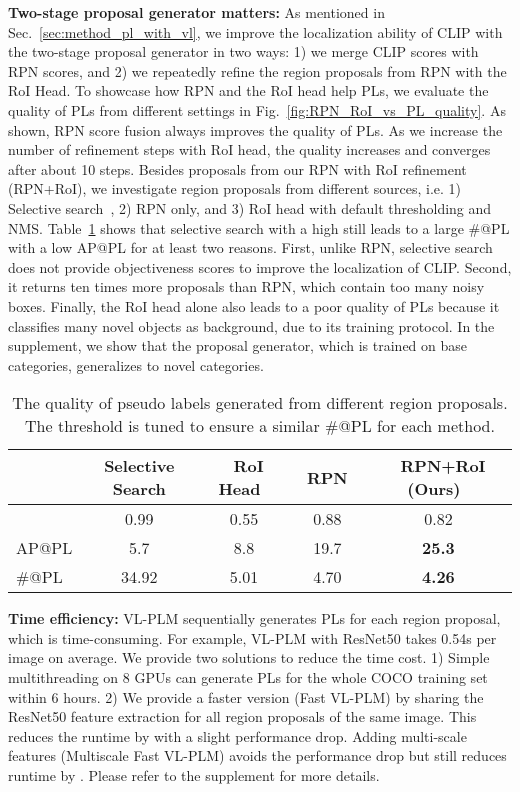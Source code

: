 \documentclass[runningheads]{llncs}
\begin{document}
\vspace{1mm}
\noindent \textbf{Two-stage proposal generator matters: }
As mentioned in Sec.~\ref{sec:method_pl_with_vl}, we improve the localization ability of CLIP with the two-stage proposal generator in two ways:
1) we merge CLIP scores with RPN scores,
and 2) we repeatedly refine the region proposals from RPN with the RoI Head.
To showcase how RPN and the RoI head help PLs, we evaluate the quality of PLs from different settings in Fig.~\ref{fig:RPN_RoI_vs_PL_quality}.
As shown, RPN score fusion always improves the quality of PLs. As we increase the number of refinement steps with RoI head, the quality increases and converges after about 10 steps. 
Besides proposals from our RPN with RoI refinement (RPN+RoI), we investigate region proposals from different sources, i.e. 1) Selective search~\cite{Uijlings13_selectivesearch}, 2) RPN only, and 3) RoI head with default thresholding and NMS.
Table~\ref{tab:proposals_vs_PL_quality} shows that selective search with a high  still leads to a large \#@PL with a low AP@PL for at least two reasons. First, unlike RPN, selective search does not provide objectiveness scores to improve the localization of CLIP. Second, it returns ten times more proposals than RPN, which contain too many noisy boxes.
Finally, the RoI head alone also leads to a poor quality of PLs because it classifies many novel objects as background, due to its training protocol.
In the supplement, we show that the proposal generator, which is trained on base categories, generalizes to novel categories.


\begin{table}[tb]
\begin{center}
\caption{The quality of pseudo labels generated from different region proposals. The threshold  is tuned to ensure a similar \#@PL for each method.}
\label{tab:proposals_vs_PL_quality}
\begin{tabular}{l c c c c}
\toprule
     &  Selective Search \cite{Uijlings13_selectivesearch} & \ RoI Head\  & \ RPN\  & \ RPN+RoI (Ours)\  \\
\hline
 & 0.99 & 0.55 & 0.88 & 0.82 \\
AP@PL     & 5.7 & 8.8 & 19.7 & \bf{25.3} \\
\#@PL  & 34.92 & 5.01 & 4.70 & \bf{4.26} \\
\bottomrule
\end{tabular}
\end{center}
\end{table}


\vspace{1mm}
\noindent \textbf{Time efficiency: }
VL-PLM sequentially generates PLs for each region proposal, which is time-consuming. For example, VL-PLM with ResNet50 takes 0.54s per image on average. We provide two solutions to reduce the time cost. 
1) Simple multithreading on 8 GPUs can generate PLs for the whole COCO training set within 6 hours.
2) We provide a faster version (Fast VL-PLM) by sharing the ResNet50 feature extraction for all region proposals of the same image. This reduces the runtime by  with a slight performance drop. Adding multi-scale features (Multiscale Fast VL-PLM) avoids the performance drop but still reduces runtime by . Please refer to the supplement for more details.
\end{document}
